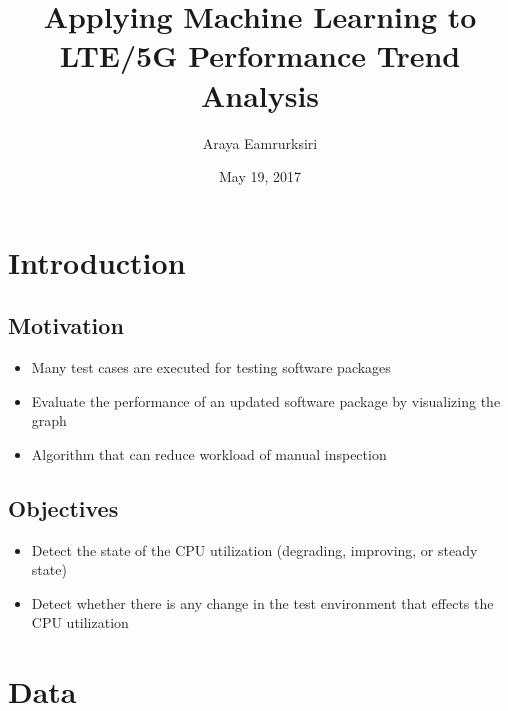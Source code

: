 \documentclass{beamer}
\title[Master Thesis]{Applying Machine Learning to LTE/5G Performance Trend Analysis} %
\author{Araya Eamrurksiri}
\institute[LiU] %
{
	Linkoping university \\ %
	\medskip
	\textit{} %
}
\date{May 19, 2017}
\begin{document}
	
	\begin{frame}
	\titlepage %
\end{frame}



\section{Introduction} 
\subsection{Motivation}
\begin{frame}

\begin{itemize}
	\item Many test cases are executed for testing software packages 
	\item Evaluate the performance of an updated software package by visualizing the graph 
	\item Algorithm that can reduce workload of manual inspection
\end{itemize}	

\end{frame}
\subsection{Objectives}
\begin{frame}
\begin{itemize}
\item Detect the state of the CPU utilization (degrading, improving, or steady state)
\item Detect whether there is any change in the test environment that effects the CPU utilization
\end{itemize}
\end{frame}

\section{Data}
\end{document}
